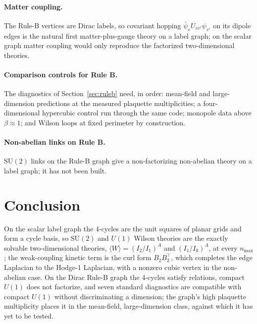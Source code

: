 \documentclass[11pt]{article}
\begin{document}
\paragraph*{Matter coupling.}  The Rule-B vertices are Dirac labels, so
covariant hopping $\bar\psi_vU_{vv'}\psi_{v'}$ on its dipole edges is the
natural first matter-plus-gauge theory on a label graph; on the scalar graph
matter coupling would only reproduce the factorized two-dimensional
theories.

\paragraph*{Comparison controls for Rule B.}  The diagnostics of
Section~\ref{sec:ruleb} need, in order: mean-field and large-dimension
predictions at the measured plaquette multiplicities; a four-dimensional
hypercubic control run through the same code; monopole data above
$\beta\approx1$; and Wilson loops at fixed perimeter by construction.

\paragraph*{Non-abelian links on Rule B.}  $\mathrm{SU}(2)$ links on the
Rule-B graph give a non-factorizing non-abelian theory on a label graph; it
has not been built.

\section{Conclusion}
\label{sec:conclusion}

On the scalar label graph the 4-cycles are the unit squares of planar grids
and form a cycle basis, so $\mathrm{SU}(2)$ and $U(1)$ Wilson theories are the
exactly solvable two-dimensional theories,
$\langle W\rangle=(I_2/I_1)^{A}$ and $(I_1/I_0)^{A}$, at every $n_{\max}$;
the weak-coupling kinetic term is the curl form $B_2B_2^{\top}$, which
completes the edge Laplacian to the Hodge-1 Laplacian, with a nonzero cubic
vertex in the non-abelian case.  On the Dirac Rule-B graph the 4-cycles
satisfy relations, compact $U(1)$ does not factorize, and seven standard
diagnostics are compatible with compact $U(1)$ without discriminating a
dimension; the graph's high plaquette multiplicity places it in the
mean-field, large-dimension class, against which it has yet to be tested.
\end{document}
